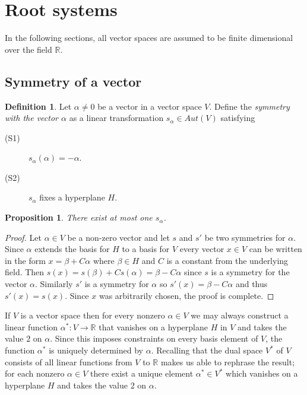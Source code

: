 \documentclass[twoside,utf8]{article}
\theoremstyle{plain}
\newtheorem{proposition}{Proposition}
\theoremstyle{definition}
\newtheorem{definition}{Definition}
\theoremstyle{remark}
\begin{document}
\section{Root systems}

In the following sections, all vector spaces are assumed to be finite dimensional over the field $\mathbb{R}$.

\subsection{Symmetry of a vector}

\begin{definition}
Let $\alpha\neq 0$ be a vector in a vector space $V$. Define the \textit{symmetry with the vector $\alpha$} as a linear transformation $s_\alpha \in Aut(V)$ satisfying
\begin{description}
\item[(S1)] $s_\alpha(\alpha)=-\alpha$.
\item[(S2)] $s_\alpha$ fixes a hyperplane $H$.
\end{description}
\end{definition}

\begin{proposition}
There exist at most one $s_\alpha$.
\end{proposition}
\begin{proof}
Let $\alpha\in V$ be a non-zero vector and let $s$ and $s'$ be two symmetries for $\alpha$. Since $\alpha$ extends the basis for $H$ to a basis for $V$ every vector $x\in V$ can be written in the form $x = \beta + C\alpha$ where $\beta \in H$ and $C$ is a constant from the underlying field. Then $s(x)=s(\beta)+Cs(\alpha) = \beta - C \alpha$ since $s$ is a symmetry for the vector $\alpha$. Similarly $s'$ is a symmetry for $\alpha$ so $s'(x)=\beta - C \alpha$ and thus $s'(x)=s(x)$. Since $x$ was arbitrarily chosen, the proof is complete.
\end{proof}

\noindent
If $V$ is a vector space then for every nonzero $\alpha \in V$ we may always construct a linear function $\alpha^* : V \rightarrow \mathbb{R}$ that vanishes on a hyperplane $H$ in $V$ and takes the value $2$ on $\alpha$. Since this imposes constraints on every basis element of $V$, the function $\alpha^*$ is uniquely determined by $\alpha$. Recalling that the dual space $V^*$ of $V$ consists of all linear functions from $V$ to $\mathbb{R}$ makes us able to rephrase the result; for each nonzero $\alpha \in V$ there exist a unique element $\alpha^*\in V^*$ which vanishes on a hyperplane $H$ and takes the value $2$ on $\alpha$.
\end{document}
